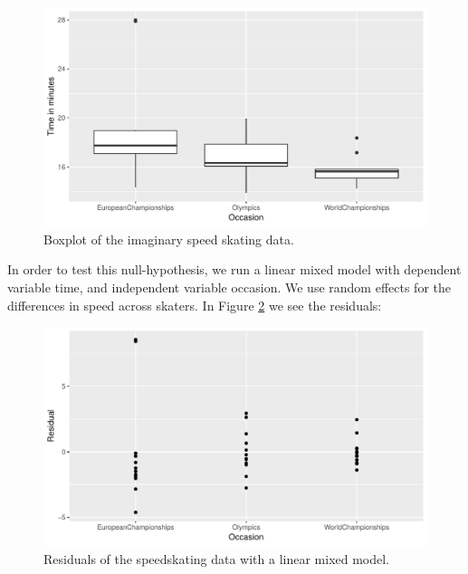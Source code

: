 \documentclass[]{book}\usepackage[]{graphicx}\usepackage[]{color}
\makeatletter
\def\maxwidth{ %
  \ifdim\Gin@nat@width>\linewidth
    \linewidth
  \else
    \Gin@nat@width
  \fi
}
\newenvironment{knitrout}{}{} %
\makeatother
\begin{document}


\begin{knitrout}
\color{fgcolor}\begin{figure}

{\centering \includegraphics[width=\maxwidth]{figure/nonparmixed_1-1} 

}

\caption[Boxplot of the imaginary speed skating data]{Boxplot of the imaginary speed skating data.}\label{fig:nonparmixed_1}
\end{figure}


\end{knitrout}

In order to test this null-hypothesis, we run a linear mixed model with dependent variable time, and independent variable occasion. We use random effects for the differences in speed across skaters. In Figure \ref{fig:nonparmixed_2} we see the residuals:

\begin{knitrout}
\color{fgcolor}\begin{figure}

{\centering \includegraphics[width=\maxwidth]{figure/nonparmixed_2-1} 

}

\caption[Residuals of the speedskating data with a linear mixed model]{Residuals of the speedskating data with a linear mixed model.}\label{fig:nonparmixed_2}
\end{figure}


\end{knitrout}
\end{document}
